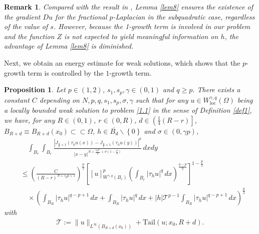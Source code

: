 \documentclass[reqno,10pt]{amsart}
\numberwithin{equation}{section}
\newtheorem{proposition}[theorem]{Proposition}
\newtheorem{remark}[theorem]{Remark}
\begin{document}
\begin{remark}
	Compared with the result in \cite{BL17}, Lemma \ref{lem8} ensures the existence of the gradient $Du$ for the fractional $p$-Laplacian in the subquadratic case, regardless of the value of $s$. However, because the 1-growth term is involved in our problem and the function $Z$ is not expected to yield meaningful information on $h$, the advantage of Lemma \ref{lem8} is diminished.
\end{remark}


Next, we obtain an energy estimate for weak solutions, which shows that the $p$-growth term is controlled by the $1$-growth term.

\begin{proposition}
	\label{pro9}
	Let $p\in(1,2)$, $s_1,s_p,\gamma\in(0,1)$ and $q\ge p$. There exists a constant $C$ depending on $N,p,q,s_1,s_p,\sigma,\gamma$ such that for any $u\in W^{\gamma,q}_{\mathrm{loc}}(\Omega)$ being a locally bounded weak solution to problem \eqref{1.1} in the sense of Definition \ref{def1}, we have, for any $R\in(0,1)$, $r\in(0,R)$, $d\in\left(\frac{1}{4}(R-r) \right] $, $B_{R+d}\equiv B_{R+d}(x_0)\subset\subset\Omega$, $h\in \overline{B_d}\backslash\left\lbrace 0\right\rbrace $ and $\sigma\in(0,\gamma p)$,
	\begin{align*}
		&\quad\int_{B_r}\int_{B_r}\frac{\left| J_{\frac{q}{p}+1}\left( \tau_hu(x)\right)-J_{\frac{q}{p}+1}\left( \tau_hu(y)\right) \right|^p }{|x-y|^{N+\frac{s_pp^2}{2}+\sigma\left( 1-\frac{p}{2}\right) }}\,dxdy\\
		&\le \left( \frac{C}{(R-r)^{N+s_pp+1}}\right)^\frac{p}{2}\left[ [u]^p_{W^{\gamma,q}(B_r)}\left( \int_{B_r}|\tau_hu|^q\,dx\right)^\frac{q-p}{q} \right]^{1-\frac{p}{2}}\\
		&\quad\times\left(\int_{B_R}|\tau_hu|^{q-p+1}\,dx+\int_{B_R}|\tau_hu|^q\,dx+|h|\mathcal{T}^{p-1}\int_{B_R}|\tau_hu|^{q-p+1}\,dx\right) ^\frac{p}{2}
	\end{align*}
	with
	\begin{align*}
		\mathcal{T}:=\|u\|_{L^\infty(B_{R+d}(x_0))}+\mathrm{Tail}(u;x_0,R+d).
	\end{align*}
\end{proposition}
\end{document}

